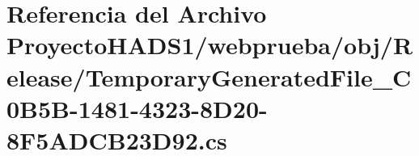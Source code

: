\hypertarget{_proyecto_h_a_d_s1_2webprueba_2obj_2_release_2_temporary_generated_file__036_c0_b5_b-1481-4323-8_d20-8_f5_a_d_c_b23_d92_8cs}{}\section{Referencia del Archivo Proyecto\+H\+A\+D\+S1/webprueba/obj/\+Release/\+Temporary\+Generated\+File\+\_\+C0\+B5\+B-\/1481-\/4323-\/8\+D20-\/8\+F5\+A\+D\+C\+B23\+D92.cs}
\label{_proyecto_h_a_d_s1_2webprueba_2obj_2_release_2_temporary_generated_file__036_c0_b5_b-1481-4323-8_d20-8_f5_a_d_c_b23_d92_8cs}
